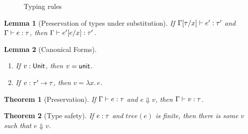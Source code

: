 \documentclass[12pt,a2paper,draft]{article}
\newcommand{\abstr}[2]{\ensuremath{\lambda{#1}.\,{#2}}}
\newcommand{\app}[2]{\ensuremath{{#1}\,{#2}}}
\newcommand{\rec}[2]{\ensuremath{{\normalfont\textsf{rec}}\,{#1}.\,{#2}}}
\newcommand{\unit}{\ensuremath{\normalfont\textsf{unit}}}
\newcommand{\Unit}{\ensuremath{\normalfont\textsf{Unit}}}
\newcommand{\tj}[2]{\mbox{\ensuremath{{#1}:{#2}}}}
\newcommand{\Tj}[3]{\mbox{\ensuremath{{#1}\vdash\tj{#2}{#3}}}}
\newcommand{\tree}[1]{\mathit{tree}(#1)}
\newtheorem{lemma}{Lemma}
\newtheorem{theorem}{Theorem}
\begin{document}
\begin{figure}[htb]
  \centering
  \caption{Typing rules}
  \label{figure:Typing_rules}
\end{figure}

\begin{lemma}[Preservation of types under substitution] \label{lemma:Preservation_of_types_under_substitution}
  If $\Tj{\Gamma[\tau/x]}{e'}{\tau'}$ and $\Tj{\Gamma}{e}{\tau}$,
  then $\Tj{\Gamma}{e'[e/x]}{\tau'}$.
\end{lemma}

\begin{lemma}[Canonical Forms] \label{lemma:Canonical_Forms} \
  \begin{enumerate}
  \item If $\tj{v}{\Unit}$, then $v = \unit$.
  \item If $\tj{v}{\tau' \to \tau}$, then $v = \abstr{x}{e}$.
  \end{enumerate}
\end{lemma}

\begin{theorem}[Preservation] \label{theorem:Preservation}
  If $\Tj{\Gamma}{e}{\tau}$ and $e \Downarrow v$, then $\Tj{\Gamma}{v}{\tau}$.
\end{theorem}

\begin{theorem}[Type safety]
  If $\tj{e}{\tau}$ and $\tree{e}$ is finite, then there is some $v$ such that $e \Downarrow v$.
\end{theorem}
\end{document}
